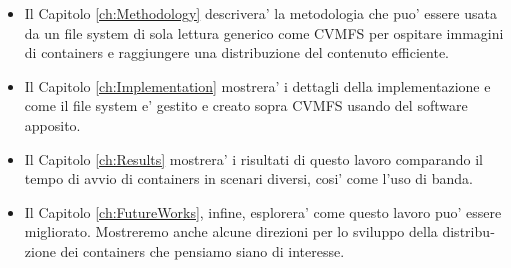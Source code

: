 \begin{otherlanguage}{italian}
\begin{itemize}
        \item Il Capitolo \ref{ch:Methodology} descrivera' la metodologia che
                puo' essere usata da un file system di sola lettura generico
                come CVMFS per ospitare immagini di containers e raggiungere
                una distribuzione del contenuto efficiente.

        \item Il Capitolo \ref{ch:Implementation} mostrera' i dettagli della
                implementazione e come il file system e' gestito e creato sopra
                CVMFS usando del software apposito.
                
        \item Il Capitolo \ref{ch:Results} mostrera' i risultati di questo
                lavoro comparando il tempo di avvio di containers in scenari
                diversi, cosi' come l'uso di banda.

        \item Il Capitolo \ref{ch:FutureWorks}, infine, esplorera' come questo
                lavoro puo' essere migliorato. Mostreremo anche alcune
                direzioni per lo sviluppo della distribuzione dei containers
                che pensiamo siano di interesse.

\end{itemize}




\end{otherlanguage}

\endgroup

\vfill
